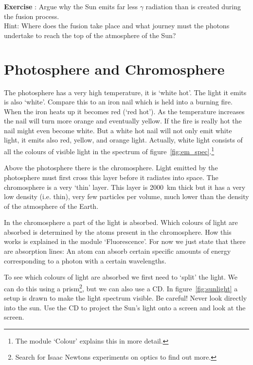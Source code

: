 \documentclass[12pt,a4paper]{article}
\numberwithin{equation}{section}
\numberwithin{figure}{section}
\newcounter{Exercise}
\numberwithin{table}{section}
\begin{document}
\begin{shaded}
\textbf{Exercise \theExercise {}} : Argue why the Sun emits far less $\gamma$ radiation than is created during the fusion process. \\ Hint: Where does the fusion take place and what journey must the photons undertake to reach the top of the atmosphere of the Sun?\end{shaded}

\section{Photosphere and Chromosphere}
The photosphere has a very high temperature, it is `white hot'. The light it emits is also `white'. Compare this to an iron nail which is held into a burning fire. When the iron heats up it becomes red (`red hot'). As the temperature increases the nail will turn more orange and eventually yellow. If the fire is really hot the nail might even become white. But a white hot nail will not only emit white light, it emits also red, yellow, and orange light. Actually, white light consists of all the colours of visible light in the spectrum of figure~\ref{fig:em_spec}.\footnote{The module `Colour' explains this in more detail.}

Above the photosphere there is the chromosphere. Light emitted by the photosphere must first cross this layer before it radiates into space. The chromosphere is a very `thin' layer. This layer is 2000~km thick but it has a very low density (i.e. thin), very few particles per volume, much lower than the density of the atmosphere of the Earth.

In the chromosphere a part of the light is absorbed. Which colours of light are absorbed is determined by the atoms present in the chromosphere. How this works is explained in the module `Fluorescence'. For now we just state that there are absorption lines: An atom can absorb certain specific amounts of energy corresponding to a photon with a certain wavelengths.

To see which colours of light are absorbed we first need to `split' the light. We can do this using a prism\footnote{Search for Isaac Newtons experiments on optics to find out more.}, but we can also use a CD. In figure~\ref{fig:sunlight} a setup is drawn to make the light spectrum visible. Be careful! Never look directly into the sun. Use the CD to project the Sun's light onto a screen and look at the screen.
\end{document}
